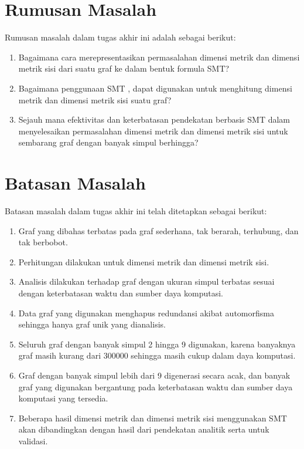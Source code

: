 \section{Rumusan Masalah}

\noindent Rumusan masalah dalam tugas akhir ini adalah sebagai berikut:
\begin{enumerate}
	\item Bagaimana cara merepresentasikan permasalahan dimensi metrik dan dimensi metrik sisi dari suatu graf ke dalam bentuk formula SMT?

	\item Bagaimana penggunaan SMT , dapat digunakan untuk menghitung dimensi metrik dan dimensi metrik sisi suatu graf?

	\item Sejauh mana efektivitas dan keterbatasan pendekatan berbasis SMT dalam menyelesaikan permasalahan dimensi metrik dan dimensi metrik sisi untuk sembarang graf dengan banyak simpul berhingga?
\end{enumerate}

\section{Batasan Masalah}

\noindent Batasan masalah dalam tugas akhir ini telah ditetapkan sebagai berikut:
\begin{enumerate}
	\item Graf yang dibahas terbatas pada graf sederhana, tak berarah, terhubung, dan tak berbobot.

	\item Perhitungan dilakukan untuk dimensi metrik dan dimensi metrik sisi.

	\item Analisis dilakukan terhadap graf dengan ukuran simpul terbatas sesuai dengan keterbatasan waktu dan sumber daya komputasi.

	\item Data graf yang digunakan menghapus redundansi akibat automorfisma sehingga hanya graf unik yang dianalisis.

	\item Seluruh graf dengan banyak simpul 2 hingga 9 digunakan, karena banyaknya graf masih kurang dari 300000 sehingga masih cukup dalam daya komputasi.

	\item Graf dengan banyak simpul lebih dari 9 digenerasi secara acak, dan banyak graf yang digunakan bergantung pada keterbatasan waktu dan sumber daya komputasi yang tersedia.

	\item Beberapa hasil dimensi metrik dan dimensi metrik sisi menggunakan SMT akan dibandingkan dengan hasil dari pendekatan analitik serta  untuk validasi.
\end{enumerate}

